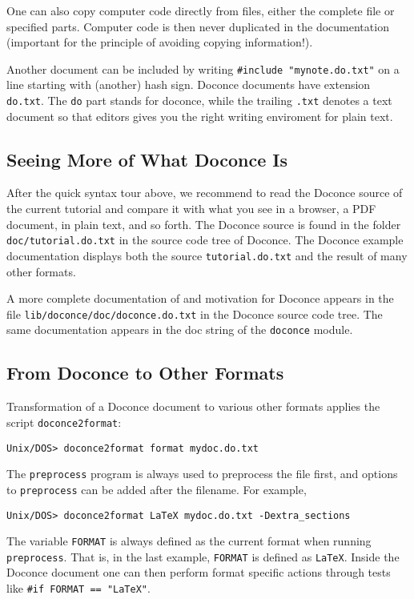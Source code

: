 \documentclass{article}
\begin{document}
One can also copy computer code directly from files, either the
complete file or specified parts.  Computer code is then never
duplicated in the documentation (important for the principle of
avoiding copying information!).

Another document can be included by writing {\fontsize{10pt}{10pt}\verb!#include "mynote.do.txt"!}
on a line starting with (another) hash sign.  Doconce documents have
extension {\fontsize{10pt}{10pt}\verb!do.txt!}. The {\fontsize{10pt}{10pt}\verb!do!} part stands for doconce, while the
trailing {\fontsize{10pt}{10pt}\verb!.txt!} denotes a text document so that editors gives you the
right writing enviroment for plain text.

\subsection*{Seeing More of What Doconce Is}

After the quick syntax tour above, we recommend to read the Doconce
source of the current tutorial and compare it with what you see in
a browser, a PDF document, in plain text, and so forth.
The Doconce source is found in the folder {\fontsize{10pt}{10pt}\verb!doc/tutorial.do.txt!} in the
source code tree of Doconce. The Doconce example documentation
displays both the source {\fontsize{10pt}{10pt}\verb!tutorial.do.txt!} and the result of many other
formats.

A more complete documentation of and motivation for Doconce appears
in the file {\fontsize{10pt}{10pt}\verb!lib/doconce/doc/doconce.do.txt!} in the Doconce
source code tree. The same documentation appears in the doc string of
the {\fontsize{10pt}{10pt}\verb!doconce!} module.


\subsection*{From Doconce to Other Formats}

Transformation of a Doconce document to various other
formats applies the script {\fontsize{10pt}{10pt}\verb!doconce2format!}:
\begin{Verbatim}[fontsize=\fontsize{9pt}{9pt},tabsize=8,baselinestretch=0.85,
fontfamily=tt,xleftmargin=7mm]
Unix/DOS> doconce2format format mydoc.do.txt
\end{Verbatim}
\noindent
The {\fontsize{10pt}{10pt}\verb!preprocess!} program is always used to preprocess the file first,
and options to {\fontsize{10pt}{10pt}\verb!preprocess!} can be added after the filename. For example,
\begin{Verbatim}[fontsize=\fontsize{9pt}{9pt},tabsize=8,baselinestretch=0.85,
fontfamily=tt,xleftmargin=7mm]
Unix/DOS> doconce2format LaTeX mydoc.do.txt -Dextra_sections
\end{Verbatim}
\noindent
The variable {\fontsize{10pt}{10pt}\verb!FORMAT!} is always defined as the current format when
running {\fontsize{10pt}{10pt}\verb!preprocess!}. That is, in the last example, {\fontsize{10pt}{10pt}\verb!FORMAT!} is
defined as {\fontsize{10pt}{10pt}\verb!LaTeX!}. Inside the Doconce document one can then perform
format specific actions through tests like {\fontsize{10pt}{10pt}\verb!#if FORMAT == "LaTeX"!}.
\end{document}
